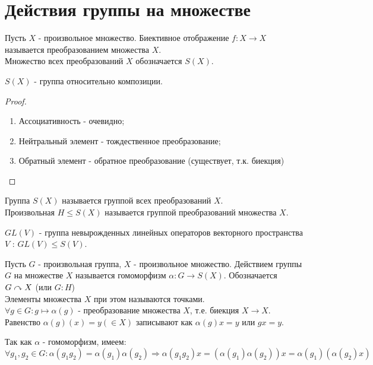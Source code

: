 \section{Действия группы на множестве}
\begin{definition}
    Пусть $X$ - произвольное множество. Биективное отображение $f: X \rightarrow X$ называется преобразованием множества $X$.\\
    Множество всех преобразований $X$ обозначается $S(X)$.
\end{definition}
\begin{subtheorem}
    $S(X)$ - группа относительно композиции.
\end{subtheorem}
\begin{proof}\tab
    \begin{enumerate}
        \item Ассоциативность - очевидно;
        \item Нейтральный элемент - тождественное преобразование;
        \item Обратный элемент - обратное преобразование (существует, т.к. биекция)
    \end{enumerate}
\end{proof}
\begin{definition}
    Группа $S(X)$ называется группой всех преобразований $X$.\\
    Произвольная $H \leq S(X)$ называется группой преобразований множества $X$.
\end{definition}
\begin{example}
    $GL(V)$ - группа невырожденных линейных операторов векторного пространства $V$ : $GL(V) \leq S(V)$.
\end{example}
\begin{definition}
    Пусть $G$ - произвольная группа, $X$ - произвольное множество. Действием группы $G$ на множестве $X$ называется гомоморфизм $\alpha: G \rightarrow S(X)$.
    Обозначается $G \curvearrowright X$ (или $G : H$)\\
    Элементы множества $X$ при этом называются точками.\\
    $\forall g \in G: g \mapsto \alpha(g)$ - преобразование множества $X$, т.е. биекция $X \rightarrow X$.\\
    Равенство $\alpha(g)(x) = y (\in X)$ записывают как $\alpha(g)x = y$ или $gx = y$.
\end{definition}
Так как $\alpha$ - гомоморфизм, имеем:
\[\forall g_1, g_2 \in G: \alpha(g_1g_2) = \alpha(g_1)\alpha(g_2) \Longrightarrow \alpha(g_1g_2)x = (\alpha(g_1)\alpha(g_2))x = \alpha(g_1)(\alpha(g_2)x)\]
